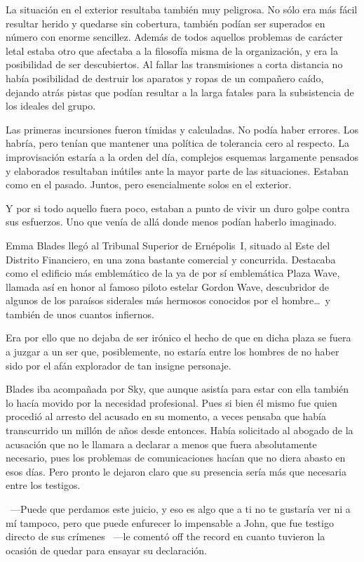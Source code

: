 La situación en el exterior resultaba también muy peligrosa. No sólo era más fácil resultar herido y quedarse sin cobertura, también podían ser superados en número con enorme sencillez. Además de todos aquellos problemas de carácter letal estaba otro que afectaba a la filosofía misma de la organización, y era la posibilidad de ser descubiertos. Al fallar las transmisiones a corta distancia no había posibilidad de destruir los aparatos y ropas de un compañero caído, dejando atrás pistas que podían resultar a la larga fatales para la subsistencia de los ideales del grupo.

Las primeras incursiones fueron tímidas y calculadas. No podía haber errores. Los habría, pero tenían que mantener una política de tolerancia cero al respecto. La improvisación estaría a la orden del día, complejos esquemas largamente pensados y elaborados resultaban inútiles ante la mayor parte de las situaciones. Estaban como en el pasado. Juntos, pero esencialmente solos en el exterior.

Y por si todo aquello fuera poco, estaban a punto de vivir un duro golpe contra sus esfuerzos. Uno que venía de allá donde menos podían haberlo imaginado.

\parbreak
Emma Blades llegó al Tribunal Superior de Ernépolis~I, situado al Este del Distrito Financiero, en una zona bastante comercial y concurrida. Destacaba como el edificio más emblemático de la ya de por sí emblemática Plaza Wave, llamada así en honor al famoso piloto estelar Gordon Wave, descubridor de algunos de los paraísos siderales más hermosos conocidos por el hombre\dots\ y también de unos cuantos infiernos.

Era por ello que no dejaba de ser irónico el hecho de que en dicha plaza se fuera a juzgar a un ser que, posiblemente, no estaría entre los hombres de no haber sido por el afán explorador de tan insigne personaje.

Blades iba acompañada por Sky, que aunque asistía para estar con ella también lo hacía movido por la necesidad profesional. Pues si bien él mismo fue quien procedió al arresto del acusado en su momento, a veces pensaba que había transcurrido un millón de años desde entonces. Había solicitado al abogado de la acusación que no le llamara a declarar a menos que fuera absolutamente necesario, pues los problemas de comunicaciones hacían que no diera abasto en esos días. Pero pronto le dejaron claro que su presencia sería más que necesaria entre los testigos.

~---Puede que perdamos este juicio, y eso es algo que a ti no te gustaría ver ni a mí tampoco, pero que puede enfurecer lo impensable a John, que fue testigo directo de sus crímenes ~---le comentó off the record en cuanto tuvieron la ocasión de quedar para ensayar su declaración.

